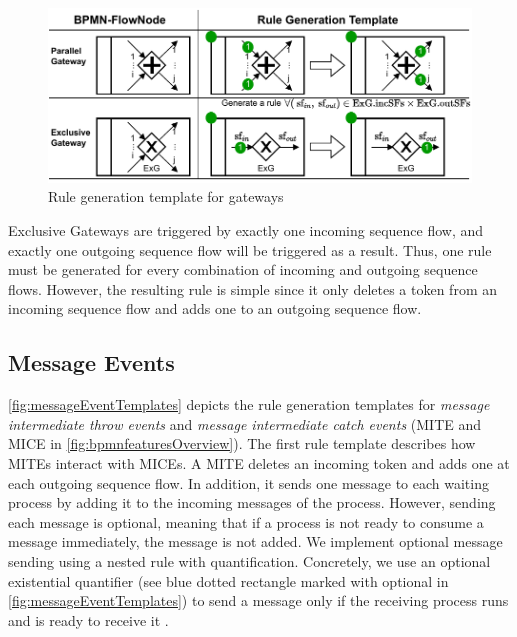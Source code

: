 \documentclass[runningheads]{llncs}
\begin{document}
\begin{figure}[ht]
    \centering
    \includegraphics[width=1\textwidth]{images/gateways_template.pdf}
    \caption{Rule generation template for gateways}
    \label{fig:gatewayTemplates}
\end{figure}

Exclusive Gateways are triggered by exactly one incoming sequence flow, and exactly one outgoing sequence flow will be triggered as a result.
Thus, one rule must be generated for every combination of incoming and outgoing sequence flows.
However, the resulting rule is simple since it only deletes a token from an incoming sequence flow and adds one to an outgoing sequence flow.

\subsection{Message Events}
\autoref{fig:messageEventTemplates} depicts the rule generation templates for \textit{message intermediate throw events} and \textit{message intermediate catch events} (\textsf{MITE} and \textsf{MICE} in \autoref{fig:bpmnfeaturesOverview}).
The first rule template describes how MITEs interact with MICEs.
A MITE deletes an incoming token and adds one at each outgoing sequence flow.
In addition, it sends one message to each waiting process by adding it to the incoming messages of the process.
However, sending each message is optional, meaning that if a process is not ready to consume a message immediately, the message is not added.
We implement optional message sending using a nested rule with quantification.
Concretely, we use an optional existential quantifier (see blue dotted rectangle marked with optional in \autoref{fig:messageEventTemplates}) to send a message only if the receiving process runs and is ready to receive it \cite{rensinkNestedQuantificationGraph2006}.
\end{document}
